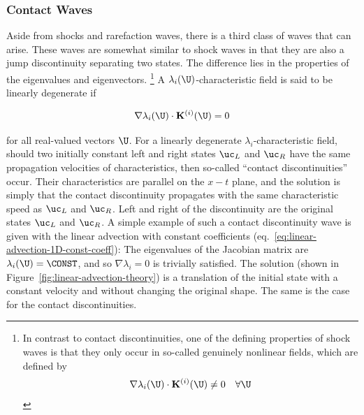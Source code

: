 \subsubsection{Contact Waves}

Aside from shocks and rarefaction waves, there is a third class of waves that can arise. These
waves are somewhat similar to shock waves in that they are also a jump discontinuity separating two
states. The difference lies in the properties of the eigenvalues and eigenvectors.
%
\footnote{In contrast to contact discontinuities, one of the defining properties of shock waves is
that they only occur in so-called genuinely nonlinear fields, which are defined by
%
\begin{align*}
    \nabla \lambda_i (\U) \cdot \mathbf{K}^{(i)}(\U) \neq 0 \quad \forall \U
\end{align*}
}
%
A $\lambda_i(\U)$-characteristic field is said to be linearly degenerate if

\begin{align}
    \nabla \lambda_i (\U) \cdot \mathbf{K}^{(i)}(\U) = 0 \label{eq:linear-degenerate-field}
\end{align}

for all real-valued vectors $\U$. For a linearly degenerate $\lambda_i$-characteristic field,
should two initially constant left and right states $\uc_L$ and $\uc_R$ have the same propagation
velocities of characteristics, then so-called ``contact discontinuities'' occur. Their
characteristics are parallel on the $x-t$ plane, and the solution is simply that the contact
discontinuity propagates with the same characteristic speed as $\uc_L$ and $\uc_R$. Left and
right of the discontinuity are the original states $\uc_L$ and $\uc_R$.
A simple example of such a contact discontinuity wave is given with the linear advection with
constant coefficients (eq.~\ref{eq:linear-advection-1D-const-coeff}): The eigenvalues of the
Jacobian matrix are $\lambda_i(\U) = \CONST$, and so $\nabla \lambda_i = 0$ is trivially satisfied.
The solution (shown in Figure~\ref{fig:linear-advection-theory}) is a translation of the initial
state with a constant velocity and without changing the original shape. The same is the case for
the contact discontinuities.










